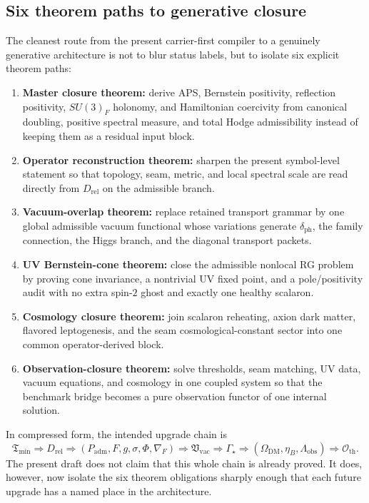 \documentclass[11pt,a4paper]{article}
\theoremstyle{definition}
\theoremstyle{remark}
\newcommand{\Tmin}{\mathfrak T_{\mathrm{min}}}
\newcommand{\Padm}{P_{\mathrm{adm}}}
\begin{document}
\subsection{Six theorem paths to generative closure}

The cleanest route from the present carrier-first compiler to a genuinely
generative architecture is not to blur status labels, but to isolate six explicit
theorem paths:
\begin{enumerate}[label=(\arabic*), leftmargin=1.5em, topsep=3pt, itemsep=2pt]
    \item \textbf{Master closure theorem:} derive APS, Bernstein positivity, reflection positivity, $SU(3)_F$ holonomy, and Hamiltonian coercivity from canonical doubling, positive spectral measure, and total Hodge admissibility instead of keeping them as a residual input block.
    \item \textbf{Operator reconstruction theorem:} sharpen the present symbol-level statement so that topology, seam, metric, and local spectral scale are read directly from $D_{\mathrm{rel}}$ on the admissible branch.
    \item \textbf{Vacuum-overlap theorem:} replace retained transport grammar by one global admissible vacuum functional whose variations generate $\delta_{\mathrm{ph}}$, the family connection, the Higgs branch, and the diagonal transport packets.
    \item \textbf{UV Bernstein-cone theorem:} close the admissible nonlocal RG problem by proving cone invariance, a nontrivial UV fixed point, and a pole/positivity audit with no extra spin-$2$ ghost and exactly one healthy scalaron.
    \item \textbf{Cosmology closure theorem:} join scalaron reheating, axion dark matter, flavored leptogenesis, and the seam cosmological-constant sector into one common operator-derived block.
    \item \textbf{Observation-closure theorem:} solve thresholds, seam matching, UV data, vacuum equations, and cosmology in one coupled system so that the benchmark bridge becomes a pure observation functor of one internal solution.
\end{enumerate}
In compressed form, the intended upgrade chain is
\[
\Tmin
\Longrightarrow
D_{\mathrm{rel}}
\Longrightarrow
(\Padm,F,g,\sigma,\Phi,\nabla_F)
\Longrightarrow
\mathfrak V_{\mathrm{vac}}
\Longrightarrow
\Gamma_\star
\Longrightarrow
(\Omega_{\mathrm{DM}},\eta_B,\Lambda_{\mathrm{obs}})
\Longrightarrow
\mathcal O_{\mathrm{th}}.
\]
The present draft does not claim that this whole chain is already proved. It does,
however, now isolate the six theorem obligations sharply enough that each future
upgrade has a named place in the architecture.
\end{document}
